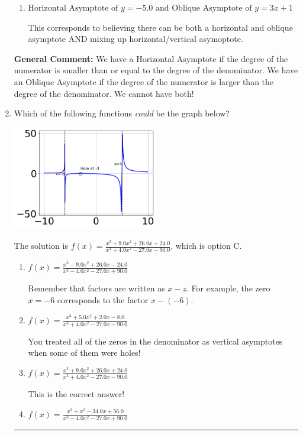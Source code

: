 \documentclass{extbook}[14pt]
\newcommand{\litem}[1]{\item #1

\rule{\textwidth}{0.4pt}}
\begin{document}
\begin{enumerate}
{\begin{enumerate}[label=\Alph*.]
This is the correct answer.
\item \( \text{Horizontal Asymptote of } y = -5.0 \text{ and Oblique Asymptote of } y = 3x + 1 \)

This corresponds to believing there can be both a horizontal and oblique asymptote AND mixing up horizontal/vertical asymoptote.
\end{enumerate}

\textbf{General Comment:} We have a Horizontal Asymptote if the degree of the numerator is smaller than or equal to the degree of the denominator. We have an Oblique Asymptote if the degree of the numerator is larger than the degree of the denominator. We cannot have both!
}
\litem{
Which of the following functions \textit{could} be the graph below?

\begin{center}
    \includegraphics[width=0.5\textwidth]{../Figures/identifyGraphOfRationalFunctionC.png}
\end{center}


The solution is \( f(x)=\frac{x^{3} +9.0 x^{2} +26.0 x + 24.0}{x^{3} +4.0 x^{2} -27.0 x -90.0} \), which is option C.\begin{enumerate}[label=\Alph*.]
\item \( f(x)=\frac{x^{3} -9.0 x^{2} +26.0 x -24.0}{x^{3} -4.0 x^{2} -27.0 x + 90.0} \)

Remember that factors are written as $x-z$. For example, the zero $x=-6$ corresponds to the factor $x-(-6)$.
\item \( f(x)=\frac{x^{3} +5.0 x^{2} +2.0 x -8.0}{x^{3} +4.0 x^{2} -27.0 x -90.0} \)

You treated all of the zeros in the denominator as vertical asymptotes when some of them were holes!
\item \( f(x)=\frac{x^{3} +9.0 x^{2} +26.0 x + 24.0}{x^{3} +4.0 x^{2} -27.0 x -90.0} \)

This is the correct answer!
\item \( f(x)=\frac{x^{3} + x^{2} -34.0 x + 56.0}{x^{3} -4.0 x^{2} -27.0 x + 90.0} \)


\end{enumerate}}
\end{enumerate}
\end{document}
